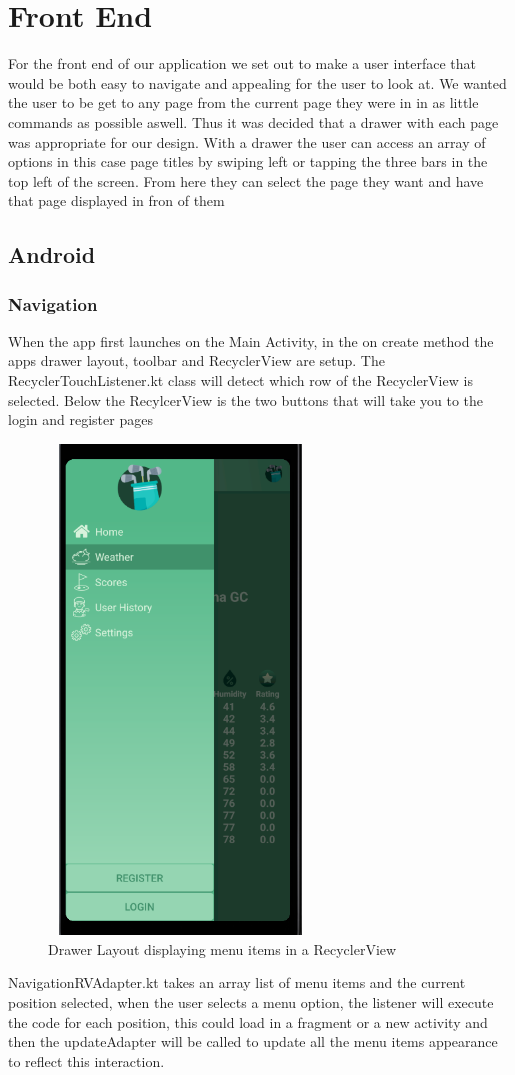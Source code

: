 \section{Front End}
For the front end of our application we set out to make a user interface that would be both easy to navigate and appealing for the user to look at. We wanted the user to be get to any page from the current page they were in in as little commands as possible aswell. Thus it was decided that a drawer with each page was appropriate for our design. With a drawer the user can access an array of options in this case page titles by swiping left or tapping the three bars in the top left of the screen. From here they can select the page they want and have that page displayed in fron of them
\subsection{Android}
\subsubsection{Navigation}
When the app first launches on the Main Activity, in the on create method the apps drawer layout, toolbar and RecyclerView are setup. The RecyclerTouchListener.kt class will detect which row of the RecyclerView is selected. Below the RecylcerView is the two buttons that will take you to the login and register pages
\begin{figure}[H]
    \centering
    \includegraphics[width=7cm, height = 13cm]{img/drawer_layout.PNG}
    \caption{Drawer Layout displaying menu items in a RecyclerView}
    \label{fig:altas config}
\end{figure}
NavigationRVAdapter.kt takes an array list of menu items and the current position selected, when the user selects a menu option, the listener will execute the code for each position, this could load in a fragment or a new activity and then the updateAdapter will be called to update all the menu items appearance to reflect this interaction.  

